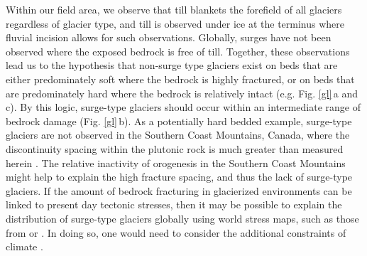 \documentclass[draft,linenumbers]{agujournal}
\begin{document}
Within our field area, we observe that till blankets the forefield of all glaciers regardless of glacier type, and till is observed under ice at the terminus where fluvial incision allows for such observations. Globally, surges have not been observed where the exposed bedrock is free of till. Together, these observations lead us to the hypothesis that non-surge type glaciers exist on beds that are either predominately soft where the bedrock is highly fractured, or on beds that are predominately hard where the bedrock is relatively intact (e.g. Fig. \ref{gl}\,a and c). By this logic, surge-type glaciers should occur within an intermediate range of bedrock damage (Fig. \ref{gl}\,b). As a potentially hard bedded example, surge-type glaciers are not observed in the Southern Coast Mountains, Canada, where the discontinuity spacing within the plutonic rock is much greater than measured herein \citep[e.g.][]{Sturzenegger2011}. 
The relative inactivity of orogenesis in the Southern Coast Mountains \citep{Parrish1983} might help to explain the high fracture spacing, and thus the lack of surge-type glaciers. If the amount of bedrock fracturing in glacierized environments can be linked to present day tectonic stresses, then it may be possible to explain the distribution of surge-type glaciers globally using world stress maps, such as those from \cite{Zoback1992} or \cite{Heidbach2010}. In doing so, one would need to consider the additional constraints of climate \citep{Sevestre2015}. 
\end{document}
